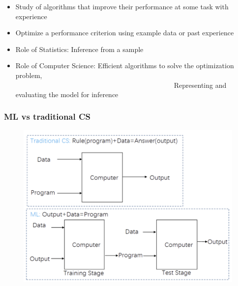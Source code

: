 \documentclass[9pt]{beamer}
\begin{document}
\begin{CJK*}{GBK}{kai}
\begin{frame}
\begin{itemize}
\item Study of algorithms that improve their performance at some task with experience
\item Optimize a performance criterion using example data or past experience
\item Role of Statistics: Inference from a sample
\item Role of Computer Science: Efficient algorithms to	solve the optimization problem,\\
~~~~~~~~~~~~~~~~~~~~~~~~~~~~~~~~~~~~~~~~~~~~~~Representing and evaluating the model for inference	
\end{itemize}
\end{frame}

\begin{frame}
	\frametitle{ML vs traditional CS}
\begin{figure}[h]
	\centering
	\includegraphics[scale=0.3]{MLvsCS.png}
	

\end{figure}
\end{frame}
\end{CJK*}
\end{document}
